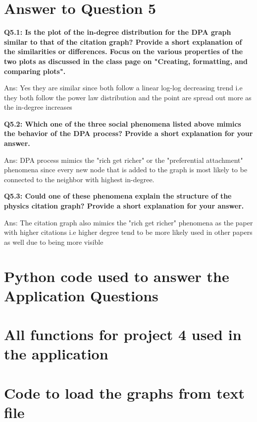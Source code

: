 \documentclass[a4paper]{article}
\begin{document}
\section*{Answer to Question 5}
\textbf{Q5.1: Is the plot of the in-degree distribution for the DPA graph similar to that of the
citation graph? Provide a short explanation of the similarities or differences.
Focus on the various properties of the two plots as discussed in the class page on
"Creating, formatting, and comparing plots".}

Ans: Yes they are similar since both follow a linear log-log decreasing trend i.e
they both follow the power law distribution and the point are spread out more
as the in-degree increases

\textbf{Q5.2: Which one of the three social phenomena listed above mimics the behavior of the DPA
process? Provide a short explanation for your answer.}

Ans: DPA process mimics the "rich get richer" or the "preferential attachment" phenomena
since every new node that is added to the graph is most likely to be connected to
the neighbor with highest in-degree.

\textbf{Q5.3: Could one of these phenomena explain the structure of the physics citation graph?
Provide a short explanation for your answer.}

Ans: The citation graph also mimics the "rich get richer" phenomena as the paper with
higher citations i.e higher degree tend to be more likely used in other papers
as well due to being more visible

 
\newpage

\appendix
\section{Python code used to answer the Application Questions}

\section{All functions for project 4 used in the application}

\section{Code to load the graphs from text file}

\end{document}
